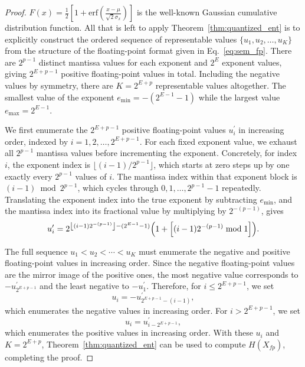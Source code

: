 \documentclass[12pt,onecolumn, margin=1in]{IEEEtran}
\newcommand{\bracket}[1]{\left[ #1 \right]}
\newcommand{\paren}[1]{\left( #1 \right)}
\newcommand{\sigx}{\sigma_x}
\newcommand{\erf}{\mathrm{erf}}
\newcommand{\Xfp}{X_{fp}}
\begin{document}
\begin{proof}
$F(x) = \frac{1}{2}\bracket{1 + \erf\paren{\frac{x -\mu}{\sqrt{2}\sigx}}}$ is the well-known Gaussian cumulative distribution function. All that is left to apply Theorem~\ref{thm:quantized_ent} is to explicitly construct the ordered sequence of representable values $\{u_1, u_2, \dots, u_K\}$ from the structure of the floating-point format given in Eq.~\eqref{eq:sem_fp}. There are $2^{p-1}$ distinct mantissa values for each exponent and $2^E$ exponent values, giving $2^{E+p-1}$ positive floating-point values in total. Including the negative values by symmetry, there are $K = 2^{E+p}$ representable values altogether.
The smallest value of the exponent $e_{\min} = -(2^{E-1}-1)$ while the largest value $e_{\max} = 2^{E-1}$.

We first enumerate the $2^{E+p-1}$ positive floating-point values $u^\prime_i$ in increasing order, indexed by $i = 1, 2, \ldots, 2^{E+p-1}$. For each fixed exponent value, we exhaust all $2^{p-1}$ mantissa values before incrementing the exponent.
Concretely, for index $i$, the exponent index is $\lfloor (i-1)/2^{p-1} \rfloor$, which starts at zero steps up by one exactly every $2^{p-1}$ values of $i$. The mantissa index within that exponent block is $(i-1) \bmod 2^{p-1}$, which cycles through $0, 1, \ldots, 2^{p-1}-1$ repeatedly. Translating the exponent index into the true exponent by subtracting $e_{\min}$, and the mantissa index into its fractional value by multiplying by $2^{-(p-1)}$, gives
\begin{equation*}
    u^\prime_i = 2^{\left\lfloor (i-1)2^{-(p-1)}\right\rfloor - (2^{E-1}-1)}\Bigl(1 + \bracket{(i-1)2^{-(p-1)} \bmod 1}\Bigr).
\end{equation*}

The full sequence $u_1 < u_2 < \cdots < u_K$ must enumerate the negative and positive floating-point values in increasing order. Since the negative floating-point values are the mirror image of the positive ones, the most negative value corresponds to $-u^\prime_{2^{E+p-1}}$ and the least negative to $-u^\prime_1$. Therefore, for $i \leq 2^{E+p-1}$, we set
\begin{equation*}
    u_i = -u^\prime_{2^{E+p-1} - (i-1)},
\end{equation*}
which enumerates the negative values in increasing order. For $i > 2^{E+p-1}$, we set
\begin{equation*}
    u_i = u^\prime_{i - 2^{E+p-1}},
\end{equation*}
which enumerates the positive values in increasing order. With these $u_i$ and $K = 2^{E+p}$, Theorem~\ref{thm:quantized_ent} can be used to compute $H(\Xfp)$, completing the proof.
\end{proof}
\end{document}
